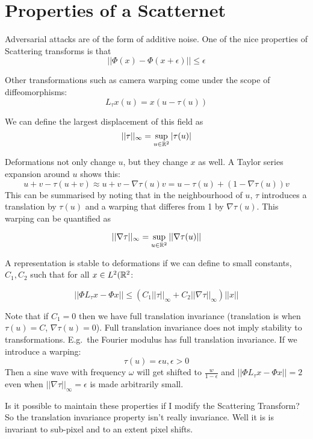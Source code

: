 \section{Properties of a Scatternet}
Adversarial attacks are of the form of additive noise. One of the nice properties of Scattering
transforms is that 
$$||\Phi(x) - \Phi(x+\epsilon)|| \leq \epsilon$$

Other transformations such as camera warping come under the scope of diffeomorphisms:
$$L_{\tau} x(u) = x(u-\tau(u))$$

We can define the largest displacement of this field as 
$$||\tau||_{\infty} = \sup_{u \in \reals[2]} |\tau(u)|$$

Deformations not only change $u$, but they change $x$ as well. A Taylor series expansion around $u$ shows this:
$$u+v - \tau(u+v) \approx u + v - \nabla \tau(u)v = u - \tau(u) + (1-\nabla\tau(u))v$$
This can be summarised by noting that in the neighbourhood of $u$, $\tau$ introduces a translation
by $\tau(u)$ and a warping that differes from 1 by $\nabla \tau(u)$. This warping can be quantified
as 

$$||\nabla \tau||_{\infty} = \sup_{u\in \reals[2]}||\nabla \tau(u)||$$

A representation is stable to deformations if we can define to small constants, $C_1, C_2$ such that
for all $x\in L^2(\reals[2]$:

$$ ||\Phi L_\tau x - \Phi x|| \leq (C_1 ||\tau||_\infty + C_2 ||\nabla \tau||_\infty) ||x||$$

Note that if $C_1 =0$ then we have full translation invariance (translation is when $\tau(u) = C$,
$\nabla \tau(u) = 0$). Full translation invariance does not imply stability to transformations.
E.g.\ the Fourier modulus has full translation invariance. If we introduce a warping:
$$\tau(u) = \epsilon u, \epsilon > 0$$
Then a sine wave with frequency $\omega$ will get shifted to $\frac{w}{1-\epsilon}$ and $||\Phi
L_\tau x - \Phi x|| = 2$ even when $||\nabla \tau||_\infty = \epsilon$ is made arbitrarily small.


Is it possible to maintain these properties if I modify the Scattering Transform? So the translation
invariance property isn't really invariance. Well it is is invariant to sub-pixel and to an extent
pixel shifts.
